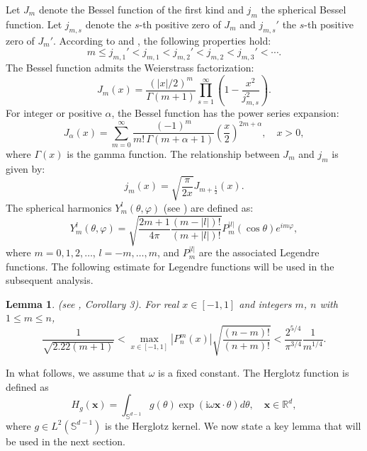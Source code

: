 \documentclass[11pt,reqno,oneside]{amsart}
\numberwithin{equation}{section}
\newtheorem{lemma}[theorem]{Lemma}
\theoremstyle{definition}
\theoremstyle{remark}
\numberwithin{equation}{section}
\begin{document}
    \fi 


        
	Let $J_m$ denote the Bessel function of the first kind and $j_m$ the spherical Bessel function. Let $j_{m,s}$ denote the $s$-th positive zero of $J_m$ and $j_{m,s}'$ the $s$-th positive zero of $J_m'$. According to \cite{Abramowitz} and \cite{LiuZou}, the following properties hold:
	\begin{equation*}
		m \leq j_{m,1}' < j_{m,1} < j_{m,2}' < j_{m,2} < j_{m,3}' < \cdots.
	\end{equation*}
	The Bessel function admits the Weierstrass factorization:
	\begin{equation*}\label{eq:bessel_factorization}
		J_m(x) = \frac{(|x|/2)^m}{\Gamma(m+1)} \prod_{s=1}^{\infty} \left(1 - \frac{x^2}{j_{m,s}^2}\right).
	\end{equation*}
	For integer or positive $\alpha$, the Bessel function has the power series expansion:
	\begin{equation}\label{eq:bessel_series}
		J_\alpha(x) = \sum_{m=0}^{\infty} \frac{(-1)^m}{m!\,\Gamma(m+\alpha+1)} \left(\frac{x}{2}\right)^{2m+\alpha}, \quad x > 0,
	\end{equation}
	where $\Gamma(x)$ is the gamma function. The relationship between $J_m$ and $j_m$ is given by:
	\begin{equation}\label{eq:bessel_spherical}
		j_m(x) = \sqrt{\frac{\pi}{2x}} J_{m+\frac{1}{2}}(x).
	\end{equation}
	The spherical harmonics $Y_m^l(\theta,\varphi)$ (see \cite[Theorem 2.8]{ColtonKress}) are defined as:
	\begin{equation}\label{eq:spherical_harmonics}
		Y_m^l(\theta, \varphi) = \sqrt{\frac{2m+1}{4\pi} \frac{(m-|l|)!}{(m+|l|)!}} P_m^{|l|}(\cos \theta) e^{i m \varphi},
	\end{equation}
	where $m = 0,1,2,\ldots$, $l = -m,\ldots,m$, and $P_m^{|l|}$ are the associated Legendre functions. The following estimate for Legendre functions will be used in the subsequent analysis. 
	\begin{lemma}\label{lem:legendre_bound}
		(see \cite{Lohofer}, Corollary 3). For real $x \in [-1,1]$ and integers $m$, $n$ with $1 \leq m \leq n$,
		\begin{equation*}
			\frac{1}{\sqrt{2.22(m+1)}} < \max_{x \in [-1,1]} |P_n^m(x)| \sqrt{\frac{(n-m)!}{(n+m)!}} < \frac{2^{5/4}}{\pi^{3/4}} \frac{1}{m^{1/4}}.
		\end{equation*}
	\end{lemma}
		In what follows, we assume that $\omega$ is a fixed constant. The Herglotz function is defined as
	\begin{equation}\label{Herglotz}
		H_{g}(\mathbf{x})=\int_{\mathbb S^{d-1}} g(\theta) \exp(\mathrm{i} \omega \mathbf{x} \cdot \theta) d\theta, \quad \mathbf{x} \in \mathbb{R}^d,
	\end{equation}
	where $g \in L^2(\mathbb{S}^{d-1})$ is the Herglotz kernel. We now state a key lemma that will be used in the next section.
	
\end{document}
